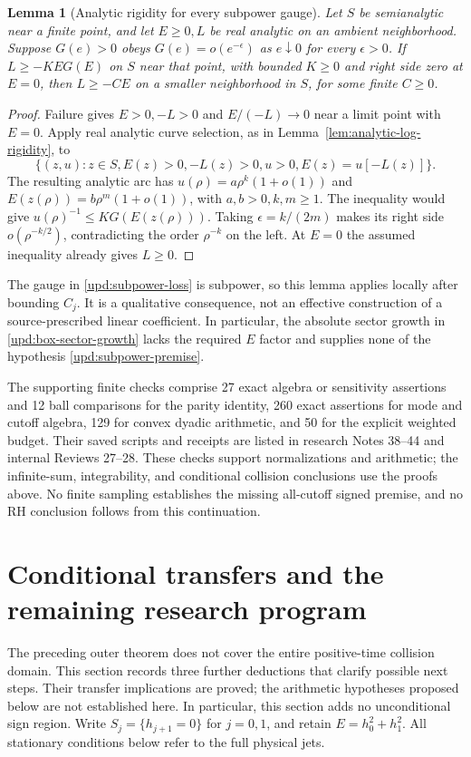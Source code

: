 \documentclass[11pt]{article}
\numberwithin{equation}{section}
\newtheorem{lemma}[theorem]{Lemma}
\theoremstyle{definition}
\theoremstyle{remark}
\begin{document}
\begin{lemma}[Analytic rigidity for every subpower gauge]
\label{upd:subpower-rigidity}
Let $S$ be semianalytic near a finite point, and let $E\ge0,L$ be
real analytic on an ambient neighborhood. Suppose $G(e)>0$ obeys
$G(e)=o(e^{-\epsilon})$ as $e\downarrow0$ for every $\epsilon>0$.
If $L\ge-K E G(E)$ on $S$ near that point, with bounded $K\ge0$
and right side zero at $E=0$, then $L\ge-CE$ on a smaller
neighborhood in $S$, for some finite $C\ge0$.
\end{lemma}
\begin{proof}
Failure gives $E>0,-L>0$ and $E/(-L)\to0$ near a limit point
with $E=0$. Apply real analytic curve selection, as in
Lemma~\ref{lem:analytic-log-rigidity}, to
\[
 \{(z,u):z\in S, E(z)>0, -L(z)>0, u>0, E(z)=u[-L(z)]\}.
\]
The resulting analytic arc has
$u(\rho)=a\rho^k(1+o(1))$ and
$E(z(\rho))=b\rho^m(1+o(1))$, with $a,b>0,k,m\ge1$.
The inequality would give $u(\rho)^{-1}\le KG(E(z(\rho)))$.
Taking $\epsilon=k/(2m)$ makes its right side
$o(\rho^{-k/2})$, contradicting the order $\rho^{-k}$ on the left.
At $E=0$ the assumed inequality already gives $L\ge0$.
\end{proof}
The gauge in \eqref{upd:subpower-loss} is subpower, so this lemma
applies locally after bounding $C_j$. It is a qualitative consequence,
not an effective construction of a source-prescribed linear coefficient.
In particular, the absolute sector growth in
\eqref{upd:box-sector-growth} lacks the required $E$ factor and supplies
none of the hypothesis \eqref{upd:subpower-premise}.

The supporting finite checks comprise 27 exact algebra or sensitivity
assertions and 12 ball comparisons for the parity identity, 260 exact
assertions for mode and cutoff algebra, 129 for convex dyadic arithmetic,
and 50 for the explicit weighted budget. Their saved scripts and receipts
are listed in research Notes 38--44 and internal Reviews 27--28.
These checks support normalizations and arithmetic; the infinite-sum,
integrability, and conditional collision conclusions use the proofs
above. No finite sampling establishes the missing all-cutoff signed
premise, and no RH conclusion follows from this continuation.


\section{Conditional transfers and the remaining research program}
\label{pg:research-program}

The preceding outer theorem does not cover the entire positive-time
collision domain.  This section records three further deductions that
clarify possible next steps.  Their transfer implications are proved;
the arithmetic hypotheses proposed below are not established here.
In particular, this section adds no unconditional sign region.
Write $S_j=\{h_{j+1}=0\}$ for $j=0,1$, and retain
$E=h_0^2+h_1^2$.  All stationary conditions below refer to the full
physical jets.
\end{document}
